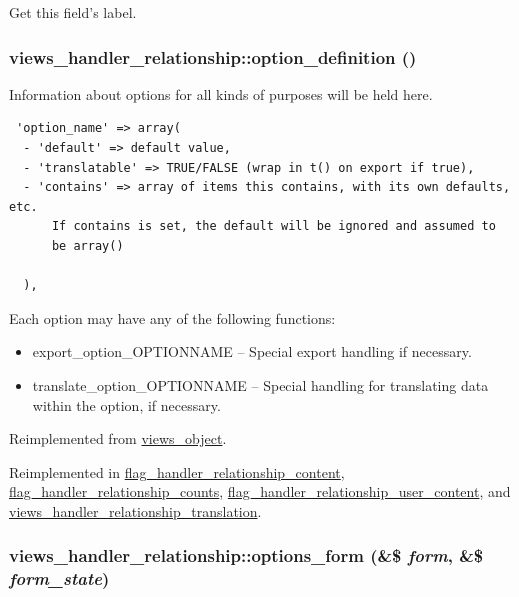 Get this field's label. \hypertarget{classviews__handler__relationship_7e7b7a0056836612aa50a60575a3d549}{
\subsubsection[{option\_\-definition}]{\setlength{\rightskip}{0pt plus 5cm}views\_\-handler\_\-relationship::option\_\-definition ()}}
\label{classviews__handler__relationship_7e7b7a0056836612aa50a60575a3d549}


Information about options for all kinds of purposes will be held here. 

\begin{Code}\begin{verbatim} 'option_name' => array(
  - 'default' => default value,
  - 'translatable' => TRUE/FALSE (wrap in t() on export if true),
  - 'contains' => array of items this contains, with its own defaults, etc.
      If contains is set, the default will be ignored and assumed to
      be array()

  ),
\end{verbatim}
\end{Code}

 Each option may have any of the following functions:\begin{itemize}
\item export\_\-option\_\-OPTIONNAME -- Special export handling if necessary.\item translate\_\-option\_\-OPTIONNAME -- Special handling for translating data within the option, if necessary. \end{itemize}


Reimplemented from \hyperlink{classviews__object_b0753d0001c8c9ff98beee696b4516ba}{views\_\-object}.

Reimplemented in \hyperlink{classflag__handler__relationship__content_54e7c1074698289ef34aa1cdd31db4bf}{flag\_\-handler\_\-relationship\_\-content}, \hyperlink{classflag__handler__relationship__counts_d72acb678e22ecdaeb867b89f051863e}{flag\_\-handler\_\-relationship\_\-counts}, \hyperlink{classflag__handler__relationship__user__content_2bbdef4e35eff90f4a109390bca06d95}{flag\_\-handler\_\-relationship\_\-user\_\-content}, and \hyperlink{classviews__handler__relationship__translation_0bf8fe73b167b63fd5ac38bd5e8b1efe}{views\_\-handler\_\-relationship\_\-translation}.\hypertarget{classviews__handler__relationship_08cc3f5947964d936b5e88d198f82c30}{
\subsubsection[{options\_\-form}]{\setlength{\rightskip}{0pt plus 5cm}views\_\-handler\_\-relationship::options\_\-form (\&\$ {\em form}, \/  \&\$ {\em form\_\-state})}}
\label{classviews__handler__relationship_08cc3f5947964d936b5e88d198f82c30}


